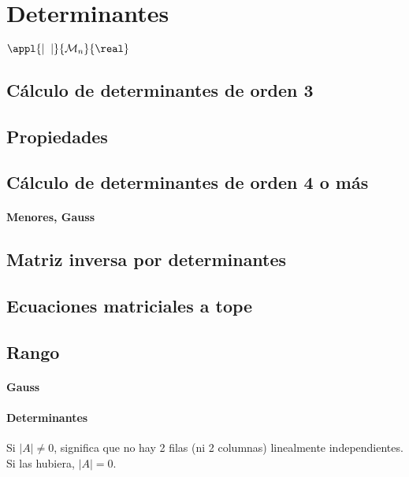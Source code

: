 \section{Determinantes}

\begin{defn}[Determinante]
$\appl{|\;\;|}{\mathcal{M}_n}{\real}$
\end{defn}

\subsection{Cálculo de determinantes de orden 3}

\subsection{Propiedades}

\subsection{Cálculo de determinantes de orden 4 o más}

\paragraph{Menores, Gauss}

\subsection{Matriz inversa por determinantes}

\subsection{Ecuaciones matriciales a tope}

\subsection{Rango}
\paragraph{Gauss}

\paragraph{Determinantes}

Si $|A| \neq 0$, significa que no hay 2 filas (ni 2 columnas) linealmente independientes. Si las hubiera, $|A| = 0$.


